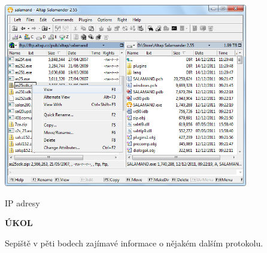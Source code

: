 \documentclass[aspectratio=1610]{beamer}
\begin{document}
\begin{frame}
    \begin{center}
    \includegraphics[width=0.8\textwidth]{img/ftp.png}
    \end{center}
\end{frame}



\begin{frame}{IP adresy}
    \begin{cardTiny}
        \begin{center}
            \textbf{ÚKOL}
        \end{center}
        \begin{flushleft}
            Sepiště v pěti bodech zajímavé informace o nějakém dalším protokolu.
        \end{flushleft}
    \end{cardTiny}
\end{frame}
\end{document}
